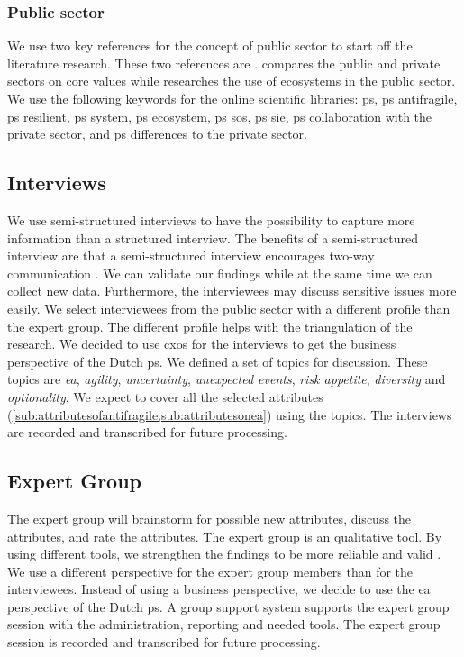 \subsubsection{Public sector}
\label{subsub:publicsector}
We use two key references for the concept of public sector to start off the literature research. These two references are \textcites{Wal2008}{Nurmi2021}. \textcite{Wal2008} compares the public and private sectors on core values while \textcite{Nurmi2021} researches the use of ecosystems in the public sector. We use the following keywords for the online scientific libraries: \gls{ps}, \gls{ps} \gls{antifragile}, \gls{ps} \gls{resilient}, \gls{ps} system, \gls{ps} ecosystem, \gls{ps} \gls{sos}, \gls{ps} \gls{sie}, \gls{ps} collaboration with the private sector, and \gls{ps} differences to the private sector.

\subsection{Interviews}
\label{sub:interviews}
We use semi-structured interviews to have the possibility to capture more information than a structured interview. The benefits of a semi-structured interview are that a semi-structured interview encourages two-way communication \parencite[p.~91]{Recker2012}. We can validate our findings while at the same time we can collect new data. Furthermore, the interviewees may discuss sensitive issues more easily. We select interviewees from the public sector with a different profile than the expert group. The different profile helps with the triangulation of the research. We decided to use \glspl{cxo} for the interviews to get the business perspective of the Dutch \gls{ps}. We defined a set of topics for discussion. These topics are \textit{\gls{ea}}, \textit{\gls{agility}}, \textit{\gls{uncertainty}}, \textit{unexpected events}, \textit{risk appetite}, \textit{\gls{diversity}} and \textit{\gls{optionality}}. We expect to cover all the selected attributes (\cref{sub:attributesofantifragile,sub:attributesonea}) using the topics. The interviews are recorded and transcribed for future processing.

\subsection{Expert Group}
\label{sub:expertgroup}
The expert group will brainstorm for possible new \glspl{attribute}, discuss the \glspl{attribute}, and rate the \glspl{attribute}. The expert group is an qualitative tool. By using different tools, we strengthen the findings to be more reliable and valid \parencite[p.~91]{Recker2012}. We use a different perspective for the expert group members than for the interviewees. Instead of using a business perspective, we decide to use the \gls{ea} perspective of the Dutch \gls{ps}. A group support system supports the expert group session with the administration, reporting and needed tools. The expert group session is recorded and transcribed for future processing.

